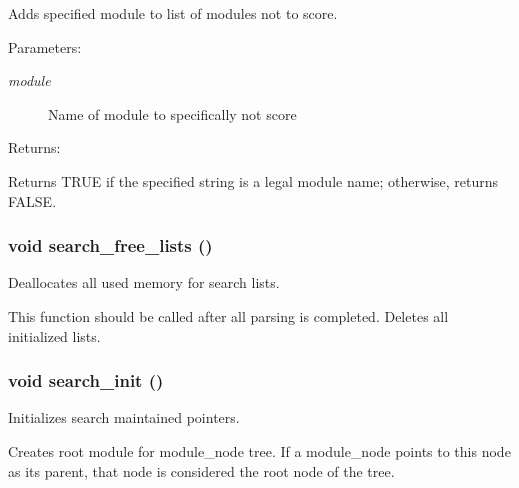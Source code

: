 Adds specified module to list of modules not to score.

\begin{Desc}
\item[Parameters: ]\par
\begin{description}
\item[{\em 
module}]Name of module to specifically not score \end{description}
\end{Desc}
\begin{Desc}
\item[Returns: ]\par
Returns TRUE if the specified string is a legal module name; otherwise, returns FALSE. \end{Desc}
\subsubsection{\setlength{\rightskip}{0pt plus 5cm}void search\_\-free\_\-lists ()}\label{search_8h_a6}


Deallocates all used memory for search lists.

This function should be called after all parsing is completed.  Deletes all initialized lists. 
\subsubsection{\setlength{\rightskip}{0pt plus 5cm}void search\_\-init ()}\label{search_8h_a0}


Initializes search maintained pointers.

Creates root module for module\_\-node tree. If a module\_\-node points to this node as its parent, that node is considered the root node of the tree. 